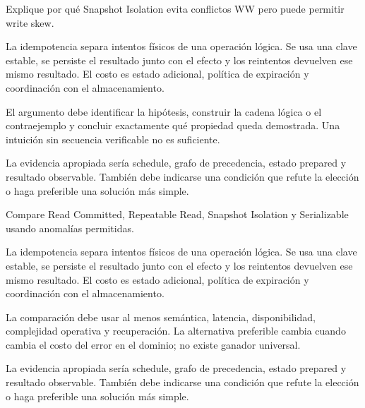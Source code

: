 \documentclass[variant=guia,cover=institutional,mode=screen]{ua-engineering-v6-article}
\begin{document}
\begin{uaexercise}
Explique por qué Snapshot Isolation evita conflictos WW pero puede permitir write skew.
\end{uaexercise}
\begin{uaanswer}
La idempotencia separa intentos físicos de una operación lógica. Se usa una clave estable, se persiste el resultado junto con el efecto y los reintentos devuelven ese mismo resultado. El costo es estado adicional, política de expiración y coordinación con el almacenamiento.

El argumento debe identificar la hipótesis, construir la cadena lógica o el contraejemplo y concluir exactamente qué propiedad queda demostrada. Una intuición sin secuencia verificable no es suficiente.

La evidencia apropiada sería schedule, grafo de precedencia, estado prepared y resultado observable. También debe indicarse una condición que refute la elección o haga preferible una solución más simple.
\end{uaanswer}

\begin{uaexercise}
Compare Read Committed, Repeatable Read, Snapshot Isolation y Serializable usando anomalías permitidas.
\end{uaexercise}
\begin{uaanswer}
La idempotencia separa intentos físicos de una operación lógica. Se usa una clave estable, se persiste el resultado junto con el efecto y los reintentos devuelven ese mismo resultado. El costo es estado adicional, política de expiración y coordinación con el almacenamiento.

La comparación debe usar al menos semántica, latencia, disponibilidad, complejidad operativa y recuperación. La alternativa preferible cambia cuando cambia el costo del error en el dominio; no existe ganador universal.

La evidencia apropiada sería schedule, grafo de precedencia, estado prepared y resultado observable. También debe indicarse una condición que refute la elección o haga preferible una solución más simple.
\end{uaanswer}
\end{document}
